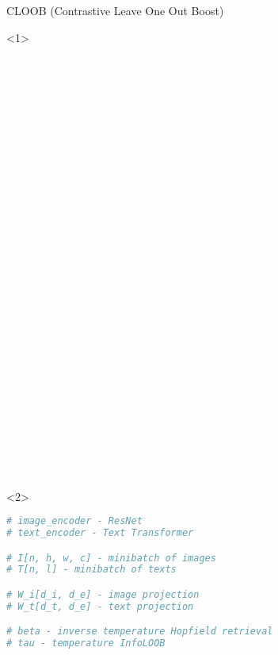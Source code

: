 \documentclass[utf8,aspectratio=169,ngerman,english,usenames,dvipsnames]{beamer}
\begin{document}
\begin{frame}[fragile]{CLOOB (Contrastive Leave One Out Boost)}
    \noindent
    \hspace*{\fill}%
    \begin{minipage}{0.8\textwidth}
        \centering

        \begin{onlyenv}<1>
            \begin{multicols}{2}
                \begin{lstlisting}[language=Python, basicstyle=\tiny]


















 \end{lstlisting}
                \columnbreak
                \begin{lstlisting}[language=Python, basicstyle=\tiny, firstnumber=last]

















 \end{lstlisting}
            \end{multicols}
        \end{onlyenv}

        \begin{onlyenv}<2>
            \begin{multicols}{2}
                \begin{lstlisting}[language=Python, basicstyle=\tiny]
# image_encoder - ResNet
# text_encoder - Text Transformer

# I[n, h, w, c] - minibatch of images
# T[n, l] - minibatch of texts

# W_i[d_i, d_e] - image projection
# W_t[d_t, d_e] - text projection

# beta - inverse temperature Hopfield retrieval
# tau - temperature InfoLOOB







 \end{lstlisting}
                \columnbreak
                \begin{lstlisting}[language=Python, basicstyle=\tiny, firstnumber=last]


















\end{lstlisting}
\end{multicols}
\end{onlyenv}
\end{minipage}
\end{frame}
\end{document}
